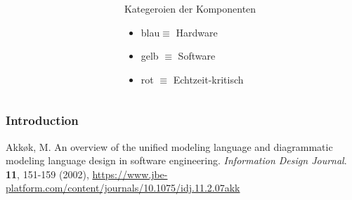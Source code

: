 \documentclass[xcolor=dvipsnames]{beamer}
\begin{document}
\begin{frame}
\begin{columns}
\begin{column}{0.70\textwidth}
\begin{minipage}{1.0\textwidth}
{\begin{tikzpicture}
						
						
		
						
						
					\end{tikzpicture}
				}
			\end{minipage}
		\end{column}
		\begin{column}{0.30\textwidth}
			\begin{block}{Kategeroien der Komponenten}
				\begin{itemize}
					\item blau$\equiv$ Hardware
					\item gelb $\equiv$ Software
					\item rot	$\equiv$ Echtzeit-kritisch
				\end{itemize}
				
				
			\end{block}
		\end{column}
	\end{columns}
\end{frame}



\begin{frame}
	\frametitle{Introduction}
	
	
	
	
\end{frame}


\begin{frame}
\tiny

\begin{thebibliography}{00}
	
	Akkøk, M. An overview of the unified modeling language and diagrammatic modeling language design in software engineering. {\em Information Design Journal}. \textbf{11}, 151-159 (2002), \url{https://www.jbe-platform.com/content/journals/10.1075/idj.11.2.07akk}

\end{thebibliography}
\end{frame}





	
	
	
	
	
\end{document}
